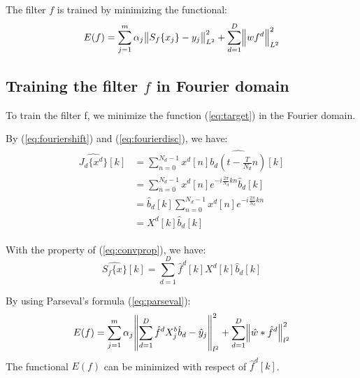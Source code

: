 \documentclass[12pt]{article}
\numberwithin{equation}{section}
\begin{document}
The filter $f$ is trained by minimizing the functional: 
\begin{equation} \label{eq:target}
	E(f)=\sum^{m}_{j=1} \alpha_j \norm{S_f\{x_j\}-y_j}^2_{L^2} + \sum^D_{d=1} \norm{w f^d}^2_{L^2}
\end{equation}

\subsection{Training the filter $f$ in Fourier domain}
To train the filter f, we minimize the function (\ref{eq:target}) in the Fourier domain. \par
By (\ref{eq:fouriershift}) and (\ref{eq:fourierdisc}), we have:
\begin{align}\begin{split}
	\widehat{J_d\{x^d\}}[k]&=\sum^{N_d-1}_{n=0} x^d[n] \widehat{b_d(t-\frac{T}{N_d} n)}[k] \\
	&=\sum^{N_d-1}_{n=0} x^d[n] e^{-i\frac{2\pi}{N_d}kn} \hat{b}_d[k] \\
	&=\hat{b}_d[k] \sum^{N_d-1}_{n=0} x^d[n] e^{-i\frac{2\pi}{N_d}kn}  \\
	&=X^d[k] \hat{b}_d[k] 
\end{split}\end{align} \par 
With the property of (\ref{eq:convprop}), we have:
\begin{equation} \label{eq:scoreFourier}
	\widehat{S_f\{x\}}[k]= \sum^D_{d=1} \hat{f}^d[k] X^d[k] \hat{b}_d[k] 
\end{equation} \par
By using Parseval's formula (\ref{eq:parseval}):
\begin{equation} \label{eq:targetFourier}
	E(f)=\sum^{m}_{j=1} \alpha_j \norm{\sum^D_{d=1}\hat{f}^dX^b_j\hat{b}_d-\hat{y}_j}^2_{l^2}
		 + \sum^D_{d=1} \norm{\hat{w} * \hat{f}^d}^2_{l^2}
\end{equation}
The functional $E(f)$ can be minimized with respect of $\hat{f}^d[k]$. \par 

\end{document}
